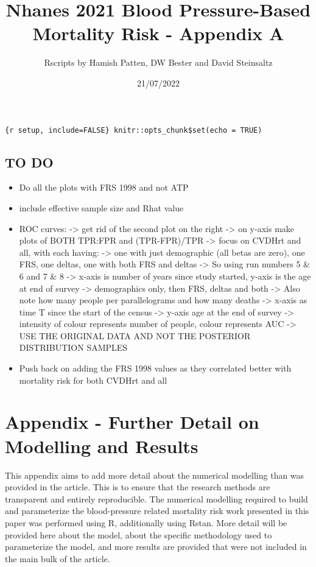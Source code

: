 \documentclass[
]{article}
\title{Nhanes 2021 Blood Pressure-Based Mortality Risk - Appendix A}
\author{Rscripts by Hamish Patten, DW Bester and David Steinsaltz}
\date{21/07/2022}
\providecommand{\tightlist}{%
  \setlength{\itemsep}{0pt}\setlength{\parskip}{0pt}}
\begin{document}
\maketitle

{
\setcounter{tocdepth}{3}
\tableofcontents
}
\texttt{\{r\ setup,\ include=FALSE\}\ knitr::opts\_chunk\$set(echo\ =\ TRUE)}

\hypertarget{to-do}{%
\subsection{TO DO}\label{to-do}}

\begin{itemize}
\tightlist
\item
  Do all the plots with FRS 1998 and not ATP
\item
  include effective sample size and Rhat value
\item
  ROC curves: -\textgreater{} get rid of the second plot on the right
  -\textgreater{} on y-axis make plots of BOTH TPR:FPR and (TPR-FPR)/TPR
  -\textgreater{} focus on CVDHrt and all, with each having:
  -\textgreater{} one with just demographic (all betas are zero), one
  FRS, one deltas, one with both FRS and deltas -\textgreater{} So using
  run numbers 5 \& 6 and 7 \& 8 -\textgreater{} x-axis is number of
  years since study started, y-axis is the age at end of survey
  -\textgreater{} demographics only, then FRS, deltas and both
  -\textgreater{} Also note how many people per parallelograms and how
  many deaths -\textgreater{} x-axis as time T since the start of the
  census -\textgreater{} y-axis age at the end of survey -\textgreater{}
  intensity of colour represents number of people, colour represents AUC
  -\textgreater{} USE THE ORIGINAL DATA AND NOT THE POSTERIOR
  DISTRIBUTION SAMPLES
\item
  Push back on adding the FRS 1998 values as they correlated better with
  mortality risk for both CVDHrt and all
\end{itemize}

\hypertarget{appendix---further-detail-on-modelling-and-results}{%
\section{Appendix - Further Detail on Modelling and
Results}\label{appendix---further-detail-on-modelling-and-results}}

This appendix aims to add more detail about the numerical modelling than
was provided in the article. This is to ensure that the research methods
are transparent and entirely reproducible. The numerical modelling
required to build and parameterize the blood-pressure related mortality
risk work presented in this paper was performed using R, additionally
using Rstan. More detail will be provided here about the model, about
the specific methodology used to parameterize the model, and more
results are provided that were not included in the main bulk of the
article.
\end{document}
